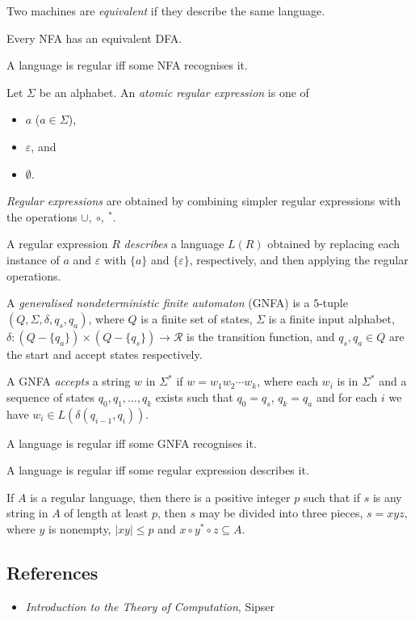 \begin{defn}
  Two machines are \emph{equivalent} if they describe the same language.
\end{defn}
\begin{prop}
  Every NFA has an equivalent DFA\@.
\end{prop}
\begin{cor}
  A language is regular iff some NFA recognises it.
\end{cor}
\begin{defn}
  Let $\Sigma$ be an alphabet. An \emph{atomic regular expression} is one of
  \begin{itemize}
    \item $a$ ($a\in\Sigma$),
    \item $\varepsilon$, and
    \item $\emptyset$.
  \end{itemize}

  \emph{Regular expressions} are obtained by combining simpler regular
  expressions with the operations $\cup,\ \circ,\ {}^*$.

  A regular expression $R$ \emph{describes} a language $L(R)$ obtained by
  replacing each instance
  of $a$ and $\varepsilon$ with $\{a\}$ and $\{\varepsilon\}$, respectively, and
  then applying the regular operations. 
\end{defn}
\begin{defn}
  A \emph{generalised nondeterministic finite automaton} (GNFA) is a $5$-tuple
  $(Q,\Sigma,\delta,q_s,q_a)$, where $Q$ is a finite set of states, $\Sigma$ is
  a finite input alphabet, $\delta:(Q-\{q_a\})\times(Q-\{q_s\})\to\mathcal R$ is
  the transition function, and $q_s,q_a\in Q$ are the start and accept states
  respectively.

  A GNFA \emph{accepts} a string $w$ in $\Sigma^*$ if $w=w_1w_2\cdots w_k$,
  where each $w_i$ is in $\Sigma^*$ and a sequence of states
  $q_0,q_1,\ldots,q_k$ exists such that $q_0=q_s$, $q_k=q_a$ and for each $i$
  we have $w_i\in L(\delta(q_{i-1},q_i))$.
\end{defn}
\begin{prop}
  A language is regular iff some GNFA recognises it.
\end{prop}
\begin{thm}
  A language is regular iff some regular expression describes it.
\end{thm}
\begin{lem}
  If $A$ is a regular language, then there is a positive integer $p$ such that
  if $s$ is any string in $A$ of length at least $p$, then $s$ may be divided
  into three pieces, $s=xyz$, where $y$ is nonempty, $|xy|\le p$ and $x\circ
  y^*\circ z\subseteq A$.
\end{lem}
\subsection*{References}
\begin{itemize}
  \item \emph{Introduction to the Theory of Computation}, Sipser
\end{itemize}
